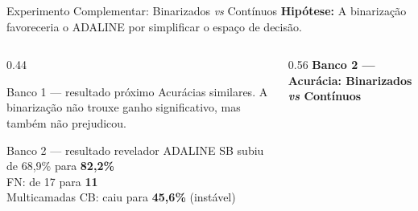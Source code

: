 \documentclass[aspectratio=169,11pt,brazil]{beamer}
\begin{document}
\begin{frame}{Experimento Complementar: Binarizados \textit{vs} Contínuos}
  \textbf{Hipótese:} A binarização favoreceria o ADALINE por simplificar o espaço de decisão.
  \vspace{0.3em}

  \begin{columns}[T]
    \begin{column}{0.44\textwidth}
      \begin{block}{Banco 1 — resultado próximo}
        \small Acurácias similares. A binarização não trouxe ganho significativo, mas também não prejudicou.
      \end{block}

      \vspace{0.3em}
      \begin{alertblock}{Banco 2 — resultado revelador}
        \small ADALINE SB subiu de 68,9\% para \textbf{82,2\%}\\
        FN: de 17 para \textbf{11}\\[0.15em]
        Multicamadas CB: caiu para \textbf{45,6\%} (instável)
      \end{alertblock}
    \end{column}
    \begin{column}{0.56\textwidth}
      \centering
      {\small\textbf{Banco 2 — Acurácia: Binarizados \textit{vs} Contínuos}}
      \vspace{0.15em}


\end{column}
\end{columns}
\end{frame}
\end{document}
